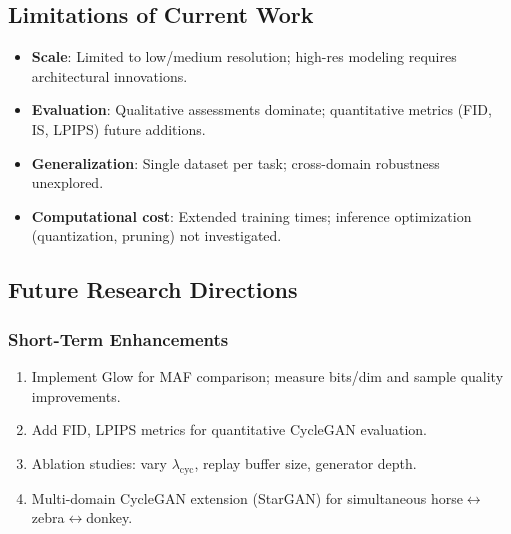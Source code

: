 \documentclass[11pt]{article}
\begin{document}
\subsection{Limitations of Current Work}
\begin{itemize}
\item \textbf{Scale}: Limited to low/medium resolution; high-res modeling requires architectural innovations.
\item \textbf{Evaluation}: Qualitative assessments dominate; quantitative metrics (FID, IS, LPIPS) future additions.
\item \textbf{Generalization}: Single dataset per task; cross-domain robustness unexplored.
\item \textbf{Computational cost}: Extended training times; inference optimization (quantization, pruning) not investigated.
\end{itemize}

\subsection{Future Research Directions}
\subsubsection{Short-Term Enhancements}
\begin{enumerate}
\item Implement Glow for MAF comparison; measure bits/dim and sample quality improvements.
\item Add FID, LPIPS metrics for quantitative CycleGAN evaluation.
\item Ablation studies: vary $\lambda_{\text{cyc}}$, replay buffer size, generator depth.
\item Multi-domain CycleGAN extension (StarGAN) for simultaneous horse$\leftrightarrow$zebra$\leftrightarrow$donkey.
\end{enumerate}
\end{document}
